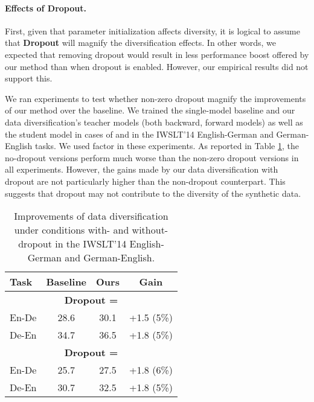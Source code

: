 \documentclass{article}
\begin{document}
\paragraph{Effects of Dropout.} 
First, given that parameter initialization affects diversity, it is logical to assume that \textbf{Dropout} will magnify the diversification effects. {In other words, we expected that removing dropout would result in less performance boost offered by our method than when dropout is enabled.} However, our empirical results did not support this.


We ran experiments to test whether non-zero dropout magnify the improvements of our method over the baseline. 
{We trained the single-model baseline and our data diversification's teacher models (both backward, forward models) as well as the student model in cases of  and  in the IWSLT'14 English-German and German-English tasks.}
We used factor  in these experiments. As reported in Table \ref{table:effect_dropout}, the no-dropout versions perform much worse than the non-zero dropout versions in all experiments. However, the gains made by our data diversification with dropout are not particularly higher than the non-dropout counterpart. This suggests that dropout may not contribute to the diversity of the synthetic data. 


\begin{table}[t]
\begin{center}
\caption{Improvements of data diversification under conditions with- and without- dropout in the IWSLT'14 English-German and German-English.}
\begin{tabular}{lccc}
\toprule
{\bf Task}                  & {\bf Baseline}    & {\bf Ours}    & {\bf Gain}\\
\midrule
\multicolumn{4}{c}{\bf Dropout = } \\
\midrule
En-De	& 28.6	& 30.1	& +1.5 (5\%)\\
De-En	& 34.7	& 36.5	& +1.8 (5\%)\\
\midrule
\multicolumn{4}{c}{\bf Dropout = } \\
\midrule
En-De	& 25.7	& 27.5	& +1.8 (6\%)\\
De-En	& 30.7	& 32.5	& +1.8 (5\%)\\

\bottomrule
\end{tabular}
\label{table:effect_dropout}
\end{center}
\end{table}
\end{document}
